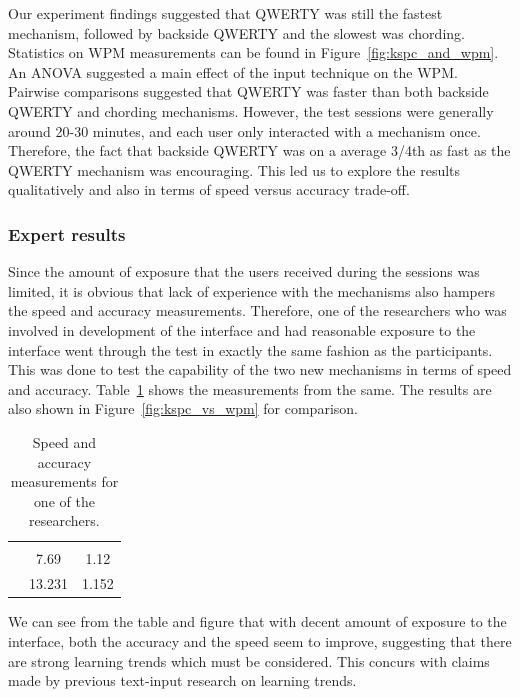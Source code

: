 Our experiment findings suggested that QWERTY was still the fastest
mechanism, followed by backside QWERTY and the slowest was
chording. Statistics on WPM measurements can be found in
Figure~\ref{fig:kspc_and_wpm}. An ANOVA suggested a main effect of the input technique on the WPM. Pairwise comparisons suggested that QWERTY was faster than both backside QWERTY
and chording mechanisms. However, the test sessions were generally around 20-30 minutes, and each user only interacted with a mechanism once. Therefore, the fact that backside
QWERTY was on a average 3/4th as fast as the QWERTY mechanism was
encouraging. This led us to explore the results qualitatively and also
in terms of speed versus accuracy trade-off.


\subsubsection{Expert results}

Since the amount of exposure that the users received during the sessions was limited, it is obvious that lack of experience with the mechanisms also hampers the speed and accuracy measurements. Therefore, one of the researchers who was involved in development of the interface and had reasonable exposure to the interface went through the test in exactly the same fashion as the participants. This was done to test the capability of the two new mechanisms in terms of speed and accuracy. Table~\ref{tab:StatisticsForTestCorpora} shows the measurements from the same.  The results are also shown in Figure~\ref{fig:kspc_vs_wpm} for comparison.

\begin{table}
	\centering
		\begin{tabular}{rcc} 
		                         & \color{grey}{WPM}    & \color{grey}{KSPC} \\ 
                   \color{grey}{Chording} & 7.69   & 1.12 \\ 
                   \color{grey}{Back-of-device QWERTY} & 13.231 & 1.152 \\ 
		\end{tabular}
	\caption{Speed and accuracy measurements for one of the researchers.}
	\label{tab:StatisticsForTestCorpora}
\end{table}

We can see from the table and figure that with decent amount of
exposure to the interface, both the accuracy and the speed seem to
improve, suggesting that there are strong learning trends which must
be considered. This concurs with claims made by previous text-input research on learning trends. \cite{LetterWise} 

